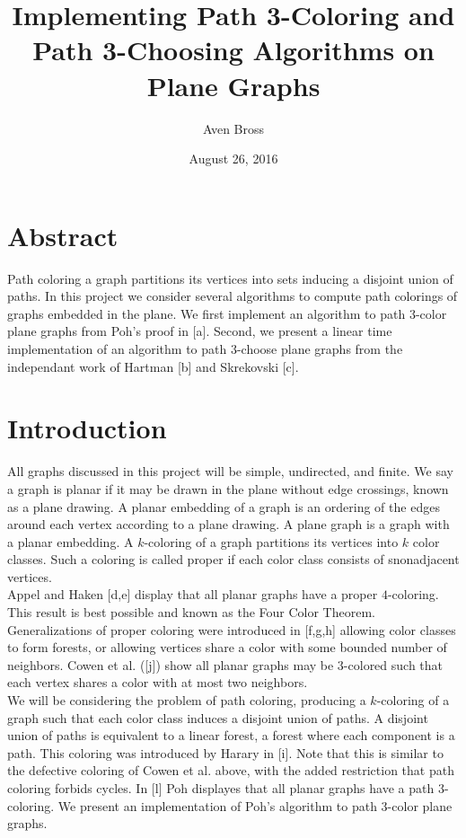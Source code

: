 \documentclass[11pt,letter]{article}
\begin{document}
\title{Implementing Path 3-Coloring and Path 3-Choosing Algorithms on Plane Graphs}
\author{Aven Bross}
\date{August 26, 2016}

\maketitle

\section*{Abstract}

Path coloring a graph partitions its vertices into sets inducing a disjoint union of paths. In this project
we consider several algorithms to compute path colorings of graphs embedded in the plane. We
first implement an algorithm to path 3-color plane graphs from Poh's proof in [a]. Second, we present a linear time
implementation of an algorithm to path 3-choose plane graphs from the independant work of Hartman [b] and
Skrekovski [c].

\section{Introduction}

All graphs discussed in this project will be simple, undirected, and finite. We say a graph is planar if it may
be drawn in the plane without edge crossings, known as a plane drawing. A planar embedding of a graph is an
ordering of the edges around each vertex according to a plane drawing. A plane graph is a graph with a
planar embedding.
A $k$-coloring of a graph partitions its vertices into $k$ color classes. Such a coloring is called proper
if each color class consists of snonadjacent vertices.\\

\noindent Appel and Haken [d,e] display that all planar graphs have a proper $4$-coloring.
This result is best possible and known as the Four Color Theorem.
Generalizations of proper coloring were introduced in [f,g,h] allowing color classes to form forests, or allowing
vertices share a color with some bounded number of neighbors. Cowen et al. ([j]) show all planar
graphs may be $3$-colored such that each vertex shares a color with at most two neighbors.\\

\noindent We will be considering the problem of path coloring, producing a $k$-coloring of a graph such that each color
class induces a disjoint union of paths. A disjoint union of paths is equivalent to a linear forest, a forest
where each component is a path. This coloring
was introduced by Harary in [i]. Note that this is similar to the defective coloring of Cowen et al. above,
with the added restriction that path coloring forbids cycles. In [l] Poh displayes that all
planar graphs have a path $3$-coloring. We present an implementation of Poh's algorithm to path
$3$-color plane graphs.\\
\end{document}
